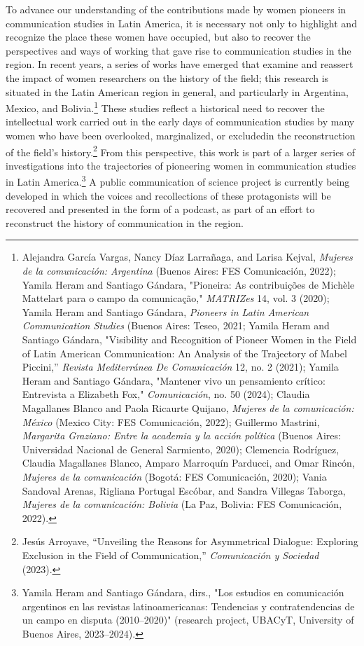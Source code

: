 \documentclass{tufte-handout}
\begin{document}
To advance our understanding of the contributions made by women pioneers
in communication studies in Latin America, it is necessary not only to
highlight and recognize the place these women have occupied, but also to
recover the perspectives and ways of working that gave rise to
communication studies in the region. In recent years, a series of works
have emerged that examine and reassert the impact of women researchers
on the history of the field; this research is situated in the Latin
American region in general, and particularly in Argentina, Mexico, and
Bolivia.\footnote{Alejandra García Vargas, Nancy Díaz Larrañaga, and
  Larisa Kejval, \emph{Mujeres de la comunicación: Argentina} (Buenos
  Aires: FES Comunicación, 2022); Yamila Heram and Santiago Gándara,
  "Pioneira: As contribuições de Michèle Mattelart para o campo da
  comunicação," \emph{MATRIZes} 14, vol. 3 (2020); Yamila Heram and
  Santiago Gándara, \emph{Pioneers in Latin American Communication
  Studies} (Buenos Aires: Teseo, 2021; Yamila Heram and Santiago
  Gándara, "Visibility and Recognition of Pioneer Women in the Field of
  Latin American Communication: An Analysis of the Trajectory of Mabel
  Piccini,'' \emph{Revista Mediterránea De Comunicación} 12, no. 2
  (2021); Yamila Heram and Santiago Gándara, "Mantener vivo un
  pensamiento crítico: Entrevista a Elizabeth Fox," \emph{Comunicación},
  no. 50 (2024); Claudia Magallanes Blanco and Paola Ricaurte Quijano,
  \emph{Mujeres de la comunicación: México} (Mexico City: FES
  Comunicación, 2022); Guillermo Mastrini, \emph{Margarita Graziano:
  Entre la academia y la acción política} (Buenos Aires: Universidad
  Nacional de General Sarmiento, 2020); Clemencia Rodríguez, Claudia
  Magallanes Blanco, Amparo Marroquín Parducci, and Omar Rincón,
  \emph{Mujeres de la comunicación} (Bogotá: FES Comunicación, 2020);
  Vania Sandoval Arenas, Rigliana Portugal Escóbar, and Sandra Villegas
  Taborga, \emph{Mujeres de la comunicación: Bolivia} (La Paz, Bolivia:
  FES Comunicación, 2022).} These studies reflect a historical need to
recover the intellectual work carried out in the early days of
communication studies by many women who have been overlooked,
marginalized, or excludedin the reconstruction of the field's
history.\footnote{Jesús Arroyave, ``Unveiling the Reasons for
  Asymmetrical Dialogue: Exploring Exclusion in the Field of
  Communication,'' \emph{Comunicación y Sociedad} (2023).} From this
perspective, this work is part of a larger series of investigations into
the trajectories of pioneering women in communication studies in Latin
America.\footnote{Yamila Heram and Santiago Gándara, dirs., "Los
  estudios en comunicación argentinos en las revistas latinoamericanas:
  Tendencias y contratendencias de un campo en disputa (2010--2020)"
  (research project, UBACyT, University of Buenos Aires, 2023--2024).} A
public communication of science project is currently being developed in
which the voices and recollections of these protagonists will be
recovered and presented in the form of a podcast, as part of an effort
to reconstruct the history of communication in the region.
\end{document}
